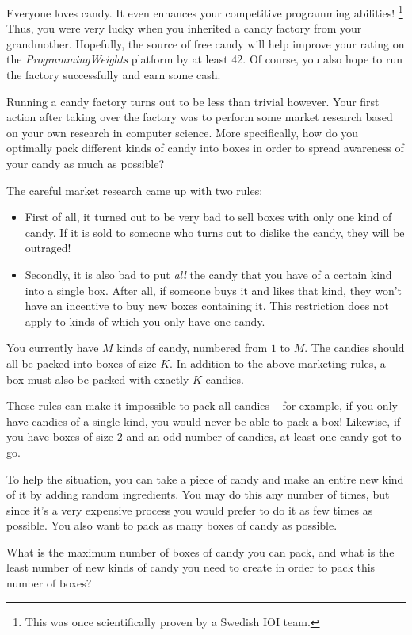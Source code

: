 Everyone loves candy.
It even enhances your competitive programming abilities!
\footnote{This was once scientifically proven by a Swedish IOI team.}
Thus, you were very lucky when you inherited a candy factory from your grandmother.
Hopefully, the source of free candy will help improve your rating on the \emph{ProgrammingWeights} platform by at least 42.
Of course, you also hope to run the factory successfully and earn some cash.

Running a candy factory turns out to be less than trivial however.
Your first action after taking over the factory was to perform some market research based on your own research in computer science.
More specifically, how do you optimally pack different kinds of candy into boxes in order to spread awareness of your candy as much as possible?

The careful market research came up with two rules:
\begin{itemize}
  \item First of all, it turned out to be very bad to sell boxes with only one kind of candy.
    If it is sold to someone who turns out to dislike the candy, they will be outraged!
  \item Secondly, it is also bad to put \emph{all} the candy that you have of a certain kind into a single box.
    After all, if someone buys it and likes that kind, they won't have an incentive to buy new boxes containing it.
    This restriction does not apply to kinds of which you only have one candy.
\end{itemize}

You currently have $M$ kinds of candy, numbered from $1$ to $M$.
The candies should all be packed into boxes of size $K$.
In addition to the above marketing rules, a box must also be packed with exactly $K$ candies.

These rules can make it impossible to pack all candies -- for example, if you only have candies of a single kind, you would never be able to pack a box!
Likewise, if you have boxes of size $2$ and an odd number of candies, at least one candy got to go.

To help the situation, you can take a piece of candy and make an entire new kind of it by adding random ingredients.
You may do this any number of times, but since it's a very expensive process you would prefer to do it as few times as possible.
You also want to pack as many boxes of candy as possible.

What is the maximum number of boxes of candy you can pack, and what is the least number of new kinds of candy you need to create in order to pack this number of boxes?

